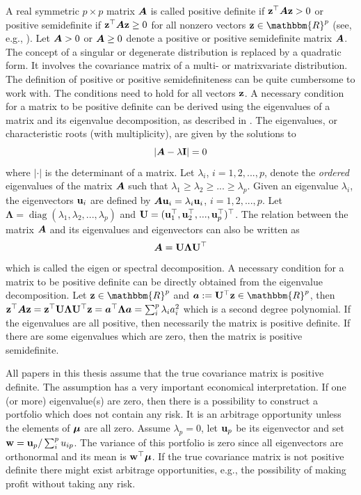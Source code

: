 \documentclass[12pt, twoside]{book}\usepackage{knitr}
\begin{document}
A real symmetric $p\times p$ matrix $\mbox{\boldmath$A$}$ is called positive definite if $\mathbf{z}^\top \mbox{\boldmath$A$} \mathbf{z} > 0$ or positive semidefinite if $\mathbf{z}^\top \mbox{\boldmath$A$} \mathbf{z} \geq 0$ for all nonzero vectors $\bz \in \mathbbm{R}^p$ (see, e.g., \cite[ch 14.2]{harville1997matrix}).
Let $\mbox{\boldmath$A$} > 0$ or $\mbox{\boldmath$A$} \geq 0$ denote a positive or positive semidefinite matrix $\mbox{\boldmath$A$}$. 
The concept of a singular or degenerate distribution is replaced by a quadratic form.
It involves the covariance matrix of a multi- or matrixvariate distribution.
The definition of positive or positive semidefiniteness can be quite cumbersome to work with. 
The conditions need to hold for all vectors $\mathbf{z}$. 
A necessary condition for a matrix to be positive definite can be derived using the eigenvalues of a matrix and its eigenvalue decomposition, as described in \citet[ch. 21]{harville1997matrix}.
The eigenvalues, or characteristic roots (with multiplicity), are given by the solutions to
\begin{equation}\label{def:eigenvalue} 
	\left|\mbox{\boldmath$A$} - \lambda \mathbf{I}\right| = 0
\end{equation}
where $|\cdot|$ is the determinant of a matrix.
Let $\lambda_i$, $i=1,2,...,p$, denote the \textit{ordered} eigenvalues of the matrix $\mbox{\boldmath$A$}$ such that $\lambda_1\geq \lambda_2 \geq ... \geq \lambda_p$.
Given an eigenvalue $\lambda_i$, the eigenvectors $\mathbf{u}_i$ are defined by $\mbox{\boldmath$A$} \mathbf{u}_i = \lambda_i \mathbf{u}_i$, $i=1,2,...,p$. 
Let $\boldsymbol{\Lambda} = \operatorname{diag}(\lambda_1, \lambda_2,...,\lambda_p)$ and $\mathbf{U}= (\mathbf{u}_1^\top, \mathbf{u}_2^\top, ..., \mathbf{u}_p^\top)^\top$. 
The relation between the matrix $\mbox{\boldmath$A$}$ and its eigenvalues and eigenvectors can also be written as 
\begin{equation}\label{eqn:eigenvalue_decomp}
	\mbox{\boldmath$A$} = \mathbf{U} \boldsymbol{\Lambda} \mathbf{U}^\top
\end{equation}
which is called the eigen or spectral decomposition.
A necessary condition for a matrix to be positive definite can be directly obtained from the eigenvalue decomposition. 
Let $\bz\in \mathbbm{R}^p$ and $\ba := \bU^{\top} \bz \in \mathbbm{R}^p$, then $\mathbf{z}^\top \mbox{\boldmath$A$} \mathbf{z} = \mathbf{z}^\top \mathbf{U} \boldsymbol{\Lambda} \mathbf{U} ^{\top} \mathbf{z} = \mbox{\boldmath$a$}^\top \boldsymbol{\Lambda} \mbox{\boldmath$a$} = \sum_i^p \lambda_i a_i^2$ which is a second degree polynomial. 
If the eigenvalues are all positive, then necessarily the matrix is positive definite. 
If there are some eigenvalues which are zero, then the matrix is positive semidefinite. 

All papers in this thesis assume that the true covariance matrix is positive definite. 
The assumption has a very important economical interpretation.
If one (or more) eigenvalue(s) are zero, then there is a possibility to construct a portfolio which does not contain any risk.
It is an arbitrage opportunity unless the elements of $\mbox{\boldmath$\mu$}$ are all zero.
Assume $\lambda_p=0$, let $\mathbf{u}_p$ be its eigenvector and set $\mathbf{w} = \mathbf{u}_p / \sum_i^p u_{ip}$. 
The variance of this portfolio is zero since all eigenvectors are orthonormal and its mean is $\mathbf{w}^\top \mbox{\boldmath$\mu$}$.
If the true covariance matrix is not positive definite there might exist arbitrage opportunities, e.g., the possibility of making profit without taking any risk.
\end{document}
